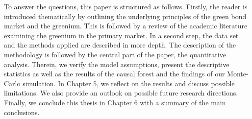 To answer the questions, this paper is structured as follows. Firstly, the reader is introduced thematically by outlining the underlying principles of the green bond market and the greenium. This is followed by a review of the academic literature examining the greenium in the primary market. In a second step, the data set and the methods applied are described in more depth. The description of the methodology is followed by the central part of the paper, the quantitative analysis. Therein, we verify the model assumptions, present the descriptive statistics as well as the results of the causal forest and the findings of our Monte-Carlo simulation. In Chapter 5, we reflect on the results and discuss possible limitations. We also provide an outlook on possible future research directions. Finally, we conclude this thesis in Chapter 6 with a summary of the main conclusions.